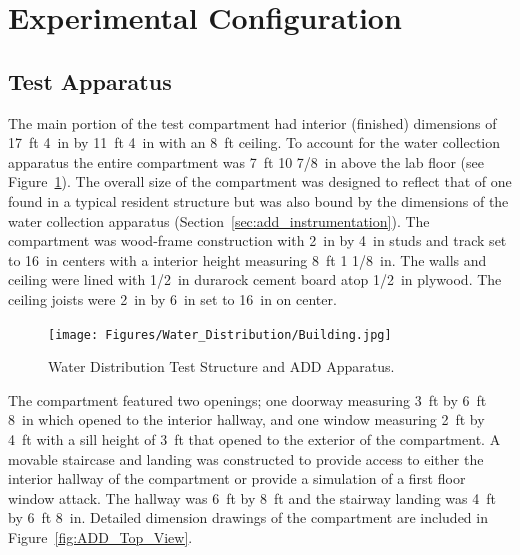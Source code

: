 \documentclass[12pt,oneside]{book}
\begin{document}
\section{Experimental Configuration}

\subsection{Test Apparatus}
\label{ADD_discussion}
The main portion of the test compartment had interior (finished) dimensions of 17~ft 4~in by 11~ft 4~in with an 8~ft ceiling. To account for the water collection apparatus the entire compartment was 7~ft 10 7/8~in above the lab floor (see Figure~\ref{fig:Water_Distribution_Test_Structure_and_ADD_Apparatus}). The overall size of the compartment was designed to reflect that of one found in a typical resident structure but was also bound by the dimensions of the water collection apparatus (Section~\ref{sec:add_instrumentation}). The compartment was wood-frame construction with 2~in by 4~in studs and track set to 16~in centers with a interior height measuring 8~ft 1 1/8~in. The walls and ceiling were lined with 1/2~in durarock cement board atop 1/2~in plywood. The ceiling joists were 2~in by 6~in set to 16~in on center.

\begin{figure}[!ht]
	\centering
	\texttt{[image: Figures/Water\_Distribution/Building.jpg]}
	\caption[Water Distribution Test Structure and ADD Apparatus]{Water Distribution Test Structure and ADD Apparatus.}
	\label{fig:Water_Distribution_Test_Structure_and_ADD_Apparatus}
\end{figure}

The compartment featured two openings; one doorway measuring 3~ft by 6~ft 8~in which opened to the interior hallway, and one window measuring 2~ft by 4~ft with a sill height of 3~ft that opened to the exterior of the compartment. A movable staircase and landing was constructed to provide access to either the interior hallway of the compartment or provide a simulation of a first floor window attack. The hallway was 6~ft by 8~ft and the stairway landing was 4~ft by 6~ft 8~in. Detailed dimension drawings of the compartment are included in Figure~\ref{fig:ADD_Top_View}.
\end{document}
